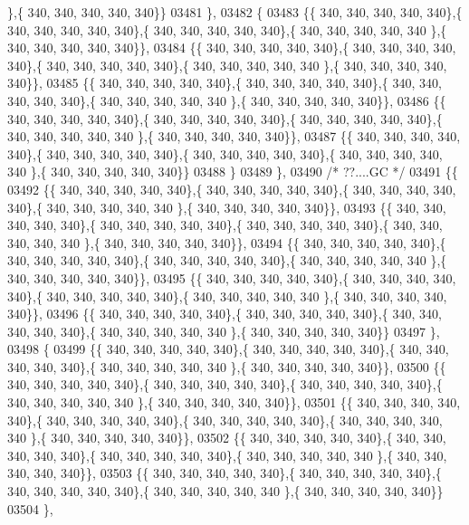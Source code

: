 \begin{DoxyCode}
      \},\{ 340, 340, 340, 340, 340\}\}
03481 \},
03482 \{
03483 \{\{ 340, 340, 340, 340, 340\},\{ 340, 340, 340, 340, 340\},\{ 340, 340, 340, 340, 340\},\{ 340, 340, 340, 340, 340
      \},\{ 340, 340, 340, 340, 340\}\},
03484 \{\{ 340, 340, 340, 340, 340\},\{ 340, 340, 340, 340, 340\},\{ 340, 340, 340, 340, 340\},\{ 340, 340, 340, 340, 340
      \},\{ 340, 340, 340, 340, 340\}\},
03485 \{\{ 340, 340, 340, 340, 340\},\{ 340, 340, 340, 340, 340\},\{ 340, 340, 340, 340, 340\},\{ 340, 340, 340, 340, 340
      \},\{ 340, 340, 340, 340, 340\}\},
03486 \{\{ 340, 340, 340, 340, 340\},\{ 340, 340, 340, 340, 340\},\{ 340, 340, 340, 340, 340\},\{ 340, 340, 340, 340, 340
      \},\{ 340, 340, 340, 340, 340\}\},
03487 \{\{ 340, 340, 340, 340, 340\},\{ 340, 340, 340, 340, 340\},\{ 340, 340, 340, 340, 340\},\{ 340, 340, 340, 340, 340
      \},\{ 340, 340, 340, 340, 340\}\}
03488 \}
03489 \},
03490 \textcolor{comment}{/* ??....GC */}
03491 \{\{
03492 \{\{ 340, 340, 340, 340, 340\},\{ 340, 340, 340, 340, 340\},\{ 340, 340, 340, 340, 340\},\{ 340, 340, 340, 340, 340
      \},\{ 340, 340, 340, 340, 340\}\},
03493 \{\{ 340, 340, 340, 340, 340\},\{ 340, 340, 340, 340, 340\},\{ 340, 340, 340, 340, 340\},\{ 340, 340, 340, 340, 340
      \},\{ 340, 340, 340, 340, 340\}\},
03494 \{\{ 340, 340, 340, 340, 340\},\{ 340, 340, 340, 340, 340\},\{ 340, 340, 340, 340, 340\},\{ 340, 340, 340, 340, 340
      \},\{ 340, 340, 340, 340, 340\}\},
03495 \{\{ 340, 340, 340, 340, 340\},\{ 340, 340, 340, 340, 340\},\{ 340, 340, 340, 340, 340\},\{ 340, 340, 340, 340, 340
      \},\{ 340, 340, 340, 340, 340\}\},
03496 \{\{ 340, 340, 340, 340, 340\},\{ 340, 340, 340, 340, 340\},\{ 340, 340, 340, 340, 340\},\{ 340, 340, 340, 340, 340
      \},\{ 340, 340, 340, 340, 340\}\}
03497 \},
03498 \{
03499 \{\{ 340, 340, 340, 340, 340\},\{ 340, 340, 340, 340, 340\},\{ 340, 340, 340, 340, 340\},\{ 340, 340, 340, 340, 340
      \},\{ 340, 340, 340, 340, 340\}\},
03500 \{\{ 340, 340, 340, 340, 340\},\{ 340, 340, 340, 340, 340\},\{ 340, 340, 340, 340, 340\},\{ 340, 340, 340, 340, 340
      \},\{ 340, 340, 340, 340, 340\}\},
03501 \{\{ 340, 340, 340, 340, 340\},\{ 340, 340, 340, 340, 340\},\{ 340, 340, 340, 340, 340\},\{ 340, 340, 340, 340, 340
      \},\{ 340, 340, 340, 340, 340\}\},
03502 \{\{ 340, 340, 340, 340, 340\},\{ 340, 340, 340, 340, 340\},\{ 340, 340, 340, 340, 340\},\{ 340, 340, 340, 340, 340
      \},\{ 340, 340, 340, 340, 340\}\},
03503 \{\{ 340, 340, 340, 340, 340\},\{ 340, 340, 340, 340, 340\},\{ 340, 340, 340, 340, 340\},\{ 340, 340, 340, 340, 340
      \},\{ 340, 340, 340, 340, 340\}\}
03504 \},

\end{DoxyCode}
